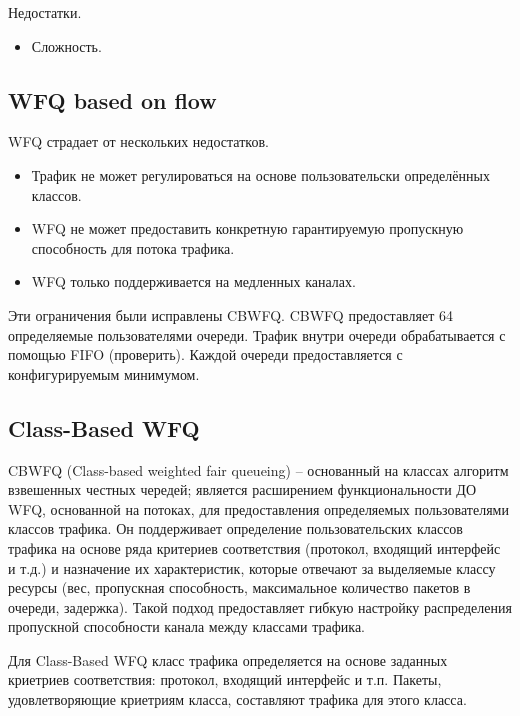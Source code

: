         Недостатки.
		\begin{itemize}
            \item Сложность.
		\end{itemize}

	\subsection{WFQ based on flow}

    WFQ страдает от нескольких недостатков.
	\begin{itemize}
    	\item  Трафик не может регулироваться на основе пользовательски определённых классов.
    	\item  WFQ не может предоставить конкретную гарантируемую пропускную способность для потока трафика.
    	\item  WFQ только поддерживается на медленных каналах.
	\end{itemize}

    Эти ограничения были исправлены CBWFQ. CBWFQ предоставляет 64 определяемые
    пользователями очереди. Трафик внутри очереди обрабатывается с помощью FIFO
    (проверить). Каждой очереди предоставляется с конфигурируемым минимумом.

	\subsection{Class-Based WFQ}


    CBWFQ (Class-based weighted fair queueing) -- основанный на классах алгоритм взвешенных честных
    чередей; является расширением функциональности ДО WFQ, основанной на потоках, для предоставления
    определяемых пользователями классов трафика. Он поддерживает
    определение пользовательских классов трафика на основе ряда критериев соответствия
    (протокол, входящий интерфейс и т.д.) и назначение их характеристик, которые
    отвечают за выделяемые классу ресурсы (вес, пропускная способность, максимальное
    количество пакетов в очереди, задержка). Такой подход предоставляет гибкую настройку
    распределения пропускной способности канала между классами трафика.

	Для Class-Based WFQ класс трафика определяется на основе заданных криетриев
	соответствия: протокол, входящий интерфейс и т.п. Пакеты, удовлетворяющие
	криетриям класса, составляют трафика для этого класса.

